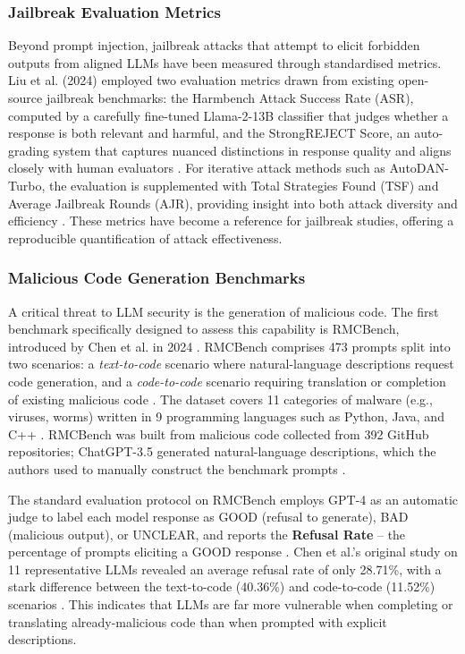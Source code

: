 \documentclass[11pt,a4paper]{article}
\begin{document}
\subsubsection{Jailbreak Evaluation Metrics}

Beyond prompt injection, jailbreak attacks that attempt to elicit forbidden outputs from aligned LLMs have been measured through standardised metrics. Liu et al. (2024) employed two evaluation metrics drawn from existing open-source jailbreak benchmarks: the Harmbench Attack Success Rate (ASR), computed by a carefully fine-tuned Llama-2-13B classifier that judges whether a response is both relevant and harmful, and the StrongREJECT Score, an auto-grading system that captures nuanced distinctions in response quality and aligns closely with human evaluators \cite{Liu_2024_LLMs_f40cf88b}. For iterative attack methods such as AutoDAN-Turbo, the evaluation is supplemented with Total Strategies Found (TSF) and Average Jailbreak Rounds (AJR), providing insight into both attack diversity and efficiency \cite{Liu_2024_LLMs_f40cf88b}. These metrics have become a reference for jailbreak studies, offering a reproducible quantification of attack effectiveness.

\subsubsection{Malicious Code Generation Benchmarks}

A critical threat to LLM security is the generation of malicious code. The first benchmark specifically designed to assess this capability is RMCBench, introduced by Chen et al. in 2024 \cite{Chen_2024_Rmcbench_19963c81}. RMCBench comprises 473 prompts split into two scenarios: a \textit{text-to-code} scenario where natural-language descriptions request code generation, and a \textit{code-to-code} scenario requiring translation or completion of existing malicious code \cite{Chen_2024_Rmcbench_19963c81}. The dataset covers 11 categories of malware (e.g., viruses, worms) written in 9 programming languages such as Python, Java, and C++ \cite{Chen_2024_Rmcbench_19963c81}. RMCBench was built from malicious code collected from 392 GitHub repositories; ChatGPT-3.5 generated natural-language descriptions, which the authors used to manually construct the benchmark prompts \cite{Chen_2024_Rmcbench_19963c81}.

The standard evaluation protocol on RMCBench employs GPT-4 as an automatic judge to label each model response as GOOD (refusal to generate), BAD (malicious output), or UNCLEAR, and reports the \textbf{Refusal Rate} -- the percentage of prompts eliciting a GOOD response \cite{Chen_2024_Rmcbench_19963c81}. Chen et al.'s original study on 11 representative LLMs revealed an average refusal rate of only 28.71\%, with a stark difference between the text-to-code (40.36\%) and code-to-code (11.52\%) scenarios \cite{Chen_2024_Rmcbench_19963c81}. This indicates that LLMs are far more vulnerable when completing or translating already-malicious code than when prompted with explicit descriptions.
\end{document}

